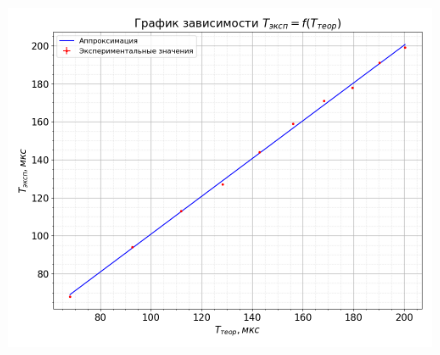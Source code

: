 \documentclass[a4paper, 12pt]{article}
\begin{document}
        \begin{figure}[H]
            \centering
            \includegraphics[scale=0.5]{img/T_plot.png}
        \end{figure}
\end{document}
